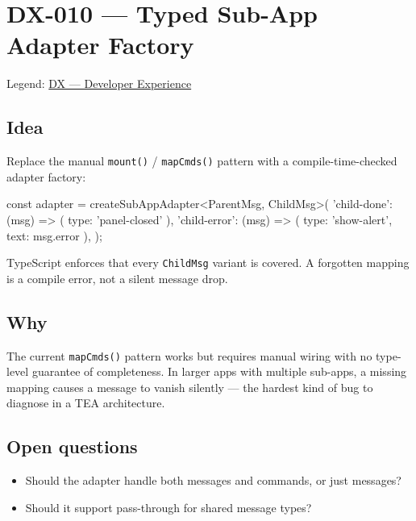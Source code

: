 \chapter{DX-010 --- Typed Sub-App Adapter Factory}\label{record-315}

\smallskip

Legend: \href{https://github.com/flyingrobots/bijou/blob/cbd70612140e7a450d764b3c7be1c6af878b99bc/docs/method/graveyard/legends/DX-developer-experience.md}{DX --- Developer Experience}

\section{Idea}\label{record-315-idea}

Replace the manual \texttt{m\allowbreak{}o\allowbreak{}u\allowbreak{}n\allowbreak{}t\allowbreak{}(\allowbreak{})} / \texttt{m\allowbreak{}a\allowbreak{}p\allowbreak{}C\allowbreak{}m\allowbreak{}d\allowbreak{}s\allowbreak{}(\allowbreak{})} pattern with a compile-time-checked adapter factory:

\begin{CodeBlock}
const adapter = createSubAppAdapter<ParentMsg, ChildMsg>({
  'child-done': (msg) => ({ type: 'panel-closed' }),
  'child-error': (msg) => ({ type: 'show-alert', text: msg.error }),
});
\end{CodeBlock}

TypeScript enforces that every \texttt{C\allowbreak{}h\allowbreak{}i\allowbreak{}l\allowbreak{}d\allowbreak{}M\allowbreak{}s\allowbreak{}g} variant is covered. A forgotten mapping is a compile error, not a silent message drop.

\section{Why}\label{record-315-why}

The current \texttt{m\allowbreak{}a\allowbreak{}p\allowbreak{}C\allowbreak{}m\allowbreak{}d\allowbreak{}s\allowbreak{}(\allowbreak{})} pattern works but requires manual wiring with no type-level guarantee of completeness. In larger apps with multiple sub-apps, a missing mapping causes a message to vanish silently --- the hardest kind of bug to diagnose in a TEA architecture.

\section{Open questions}\label{record-315-open-questions}

\begin{itemize}
\tightlist
\item
  Should the adapter handle both messages and commands, or just messages?
\item
  Should it support pass-through for shared message types?
\end{itemize}

